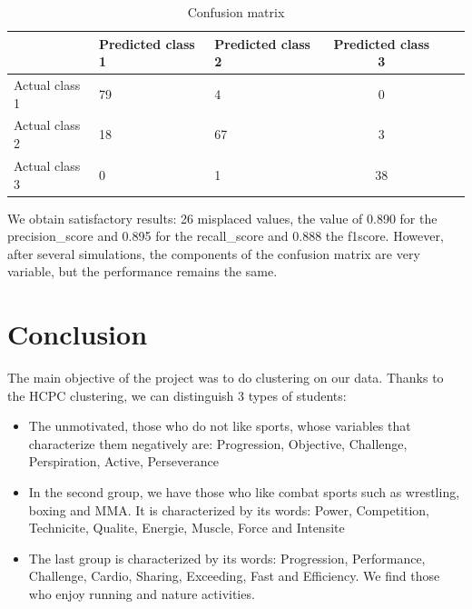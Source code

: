 \documentclass[12pt]{article}
\begin{document}
\begin{center}
    
\begin{table}[H]
    \begin{tabular}{|l|l|l|c|c|c|}
        \hline
         & Predicted class 1 & Predicted class 2 & Predicted class 3  \tabularnewline
        \hline
        Actual class 1 & 79 & 4 & 0 \tabularnewline
        \hline 
        Actual class 2 & 18 & 67  & 3  \tabularnewline
        \hline
         Actual class 3 & 0 & 1 & 38 \tabularnewline
        \hline
    \end{tabular}
    \caption{Confusion matrix}
    \label{tab:my_label}
\end{table}

\end{center}



\noindent We obtain satisfactory results: 
26 misplaced values, the value of 0.890 for the precision\_score and 0.895 for the recall\_score and 0.888 the f1\-score. However, after several simulations, the components of the confusion matrix are very variable, but the performance remains the same.  

\section{Conclusion}
The main objective of the project was to do clustering on our data.
Thanks to the HCPC clustering, we can distinguish 3 types of students:

\begin{itemize}

\item The unmotivated, those who do not like sports, whose variables that characterize them negatively are:  Progression, Objective, Challenge, Perspiration, Active, Perseverance

\item In the second group, we have those who like combat sports such as wrestling, boxing and MMA. It is characterized by its words: Power, Competition, Technicite, Qualite, Energie, Muscle, Force and Intensite 

\item  The last group is characterized by its words: Progression, Performance, 
Challenge, Cardio, Sharing, Exceeding, Fast and Efficiency. 
We find those who enjoy running and nature activities. 

\end{itemize}
\end{document}
